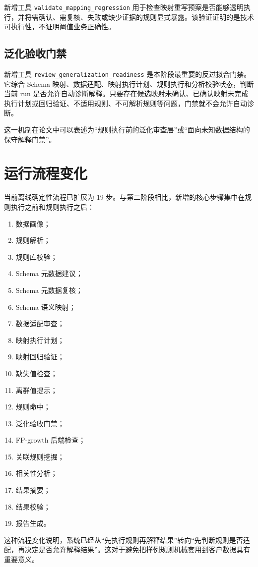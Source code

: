 \documentclass[UTF8,a4paper,zihao=-4]{ctexart}
\begin{document}
新增工具 \texttt{validate\_mapping\_regression} 用于检查映射重写预案是否能够透明执行，并将需确认、需复核、失败或缺少证据的规则显式暴露。该验证证明的是技术可执行性，不证明阈值业务正确性。

\subsection{泛化验收门禁}

新增工具 \texttt{review\_generalization\_readiness} 是本阶段最重要的反过拟合门禁。它综合 Schema 映射、数据适配、映射执行计划、规则执行和分析校验状态，判断当前 run 是否允许自动诊断解释。只要存在候选映射未确认、已确认映射未完成执行计划或回归验证、不适用规则、不可解析规则等问题，门禁就不会允许自动诊断。

这一机制在论文中可以表述为“规则执行前的泛化审查层”或“面向未知数据结构的保守解释门禁”。

\section{运行流程变化}

当前离线确定性流程已扩展为 19 步。与第二阶段相比，新增的核心步骤集中在规则执行之前和规则执行之后：
\begin{enumerate}
  \item 数据画像；
  \item 规则解析；
  \item 规则库校验；
  \item Schema 元数据建议；
  \item Schema 元数据复核；
  \item Schema 语义映射；
  \item 数据适配审查；
  \item 映射执行计划；
  \item 映射回归验证；
  \item 缺失值检查；
  \item 离群值提示；
  \item 规则命中；
  \item 泛化验收门禁；
  \item FP-growth 后端检查；
  \item 关联规则挖掘；
  \item 相关性分析；
  \item 结果摘要；
  \item 结果校验；
  \item 报告生成。
\end{enumerate}

这种流程变化说明，系统已经从“先执行规则再解释结果”转向“先判断规则是否适配，再决定是否允许解释结果”。这对于避免把样例规则机械套用到客户数据具有重要意义。
\end{document}
